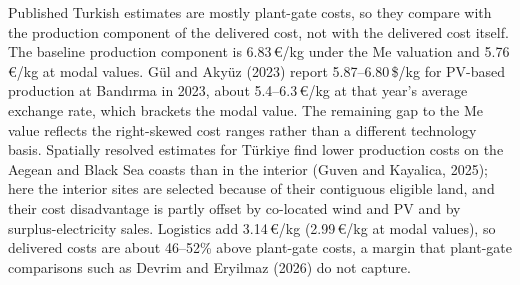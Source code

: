 Published Turkish estimates are mostly plant-gate costs, so they compare with the production component of the delivered cost, not with the delivered cost itself. The baseline production component is 6.83\,€/kg under the Me valuation and 5.76\,€/kg at modal values. G{\"u}l and Aky{\"u}z (2023) report 5.87--6.80\,\$/kg for PV-based production at Bandırma in 2023, about 5.4--6.3\,€/kg at that year's average exchange rate, which brackets the modal value. The remaining gap to the Me value reflects the right-skewed cost ranges rather than a different technology basis. Spatially resolved estimates for Türkiye find lower production costs on the Aegean and Black Sea coasts than in the interior (Guven and Kayalica, 2025); here the interior sites are selected because of their contiguous eligible land, and their cost disadvantage is partly offset by co-located wind and PV and by surplus-electricity sales. Logistics add 3.14\,€/kg (2.99\,€/kg at modal values), so delivered costs are about 46--52\% above plant-gate costs, a margin that plant-gate comparisons such as Devrim and Eryilmaz (2026) do not capture.
